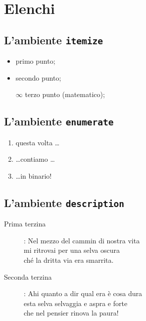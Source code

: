 \section{Elenchi}

\subsection{L'ambiente \texttt{itemize}}

\begin{itemize}
  \item primo punto;
  \item secondo punto;
  \item[$\infty$] terzo punto (matematico);
\end{itemize}

\subsection{L'ambiente \texttt{enumerate}}

\begin{enumerate}
  \item questa volta \ldots
  \setcounter{enumi}{9}
  \item \ldots contiamo \ldots
  \item \ldots in binario!
\end{enumerate}

\subsection{L'ambiente \texttt{description}}

\begin{description}
  \item[Prima terzina]:
Nel mezzo del cammin di nostra vita\\
mi ritrovai per una selva oscura\\
ché la dritta via era smarrita.
  \item[Seconda terzina]:
Ahi quanto a dir qual era è cosa dura\\
esta selva selvaggia e aspra e forte\\
che nel pensier rinova la paura!
\end{description}
